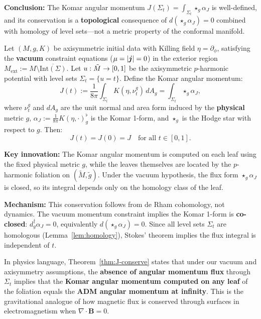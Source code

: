 \begin{remark}
\textbf{Conclusion:} The Komar angular momentum $J(\Sigma_t) = \int_{\Sigma_t} \star_g \alpha_J$ is well-defined, and its conservation is a \textbf{topological} consequence of $d(\star_g \alpha_J) = 0$ combined with homology of level sets---not a metric property of the conformal manifold.
\end{remark}

\begin{theorem}\label{thm:J-conserve}
Let $(M, g, K)$ be axisymmetric initial data with Killing field $\eta = \partial_\phi$, satisfying the \textbf{vacuum} constraint equations ($\mu = |\boldsymbol{j}| = 0$) in the exterior region $M_{\mathrm{ext}} := M \setminus \overline{\mathrm{Int}(\Sigma)}$. Let $u: \tilde{M} \to [0,1]$ be the axisymmetric $p$-harmonic potential with level sets $\Sigma_t = \{u = t\}$. Define the Komar angular momentum:
\[
J(t) := \frac{1}{8\pi}\int_{\Sigma_t} K(\eta, \nu_t^g) \, dA_g = \int_{\Sigma_t} \star_g \alpha_J,
\]
where $\nu_t^g$ and $dA_g$ are the unit normal and area form induced by the \textbf{physical} metric $g$, $\alpha_J := \frac{1}{8\pi}K(\eta, \cdot)^\flat_g$ is the Komar 1-form, and $\star_g$ is the Hodge star with respect to $g$. Then:
\[
J(t) = J(0) = J \quad \text{for all } t \in [0, 1].
\]

\textbf{Key innovation:} The Komar angular momentum is computed on each leaf using the fixed physical metric $g$, while the leaves themselves are located by the $p$-harmonic foliation on $(\tilde M,\tilde g)$. Under the vacuum hypothesis, the flux form $\star_g\alpha_J$ is closed, so its integral depends only on the homology class of the leaf.

\textbf{Mechanism:} This conservation follows from de Rham cohomology, not dynamics. The vacuum momentum constraint implies the Komar 1-form is \textbf{co-closed}: $d^\dagger_g \alpha_J = 0$, equivalently $d(\star_g \alpha_J) = 0$. Since all level sets $\Sigma_t$ are homologous (Lemma~\ref{lem:homology}), Stokes' theorem implies the flux integral is independent of $t$.
\end{theorem}

\begin{remark}\label{rem:J-conserve-physics}
In physics language, Theorem~\ref{thm:J-conserve} states that under our vacuum and axisymmetry assumptions, the \textbf{absence of angular momentum flux} through $\Sigma_t$ implies that the \textbf{Komar angular momentum computed on any leaf} of the foliation equals the \textbf{ADM angular momentum at infinity}. This is the gravitational analogue of how magnetic flux is conserved through surfaces in electromagnetism when $\nabla \cdot \mathbf{B} = 0$.
\end{remark}

